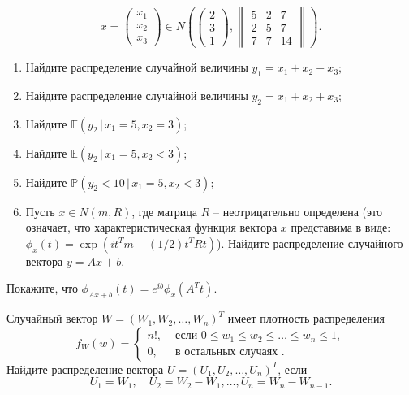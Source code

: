 \begin{problem}
$$
x=\begin{pmatrix}
x_1\\
x_2\\
x_3
\end{pmatrix}
\in N\left(
\begin{pmatrix}
2\\
3\\
1
\end{pmatrix}, 
\begin{Vmatrix}
5 & 2 & 7\\
2 & 5 & 7\\
7 & 7 & 14
\end{Vmatrix}
\right) . 
$$
\begin{enumerate}
\item Найдите распределение случайной величины $y_1=x_1+x_2-x_3$; 
\item Найдите распределение случайной величины $y_2=x_1+x_2+x_3$; 
\item Найдите ${\mathbb E}(y_2\, |\, x_1=5, x_2=3)$; 
\item Найдите ${\mathbb E}(y_2\, |\, x_1=5, x_2<3)$; 
\item Найдите ${\mathbb P}(y_2<10\, |\, x_1=5, x_2<3)$;

\item Пусть $x\in N\left(m, R\right)$, где матрица $R$ -- неотрицательно определена (это означает, что характеристическая функция вектора $x$ представима в виде: $\phi_{x}(t) = \exp\left( it^{T}m-(1/2)t^{T}Rt \right)$). Найдите распределение случайного вектора $y = Ax + b$. 

\end{enumerate}
\end{problem}

\begin{ordre}
Покажите, что
$\phi_{Ax+b}(t) = e^{ib}\phi_{x}(A^{T}t)$.
\end{ordre}



\begin{problem}
\label{sec:ordered_seq}
Случайный вектор $W=(W_1, W_2, \ldots, W_n)^T$ имеет плотность распределения 
$$
f_W(w)=\begin{cases}
n! , & \text{ если } 0\leqslant w_1\leqslant w_2\leqslant \ldots \leqslant w_n\leqslant 1, \\
0, & \text{ в остальных случаях }. 
\end{cases}
$$
Найдите распределение вектора $U=(U_1, U_2, \ldots, U_n)^T$, если 
$$
U_1=W_1, \quad U_2=W_2-W_1, \ldots, U_n=W_n-W_{n-1} . 
$$
\end{problem}

